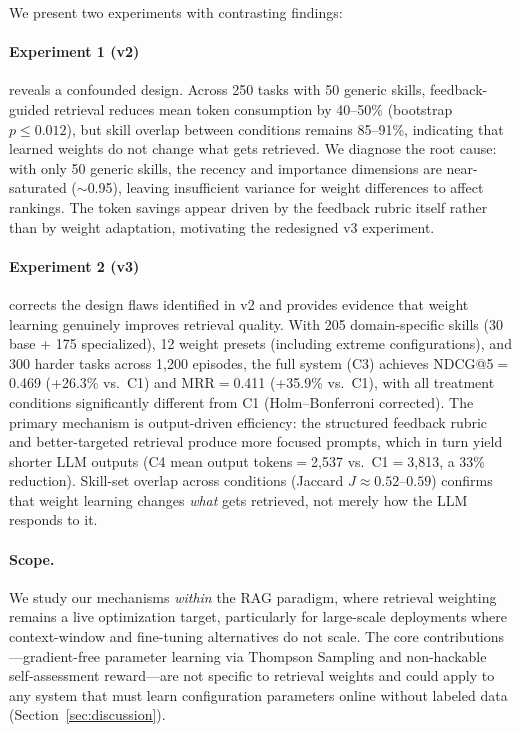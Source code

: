We present two experiments with contrasting findings:

\paragraph{Experiment 1 (v2)} reveals a confounded design.
Across 250 tasks with 50 generic skills, feedback-guided retrieval reduces mean token consumption by 40--50\% (bootstrap $p \leq 0.012$), but skill overlap between conditions remains 85--91\%, indicating that learned weights do not change what gets retrieved.
We diagnose the root cause: with only 50 generic skills, the recency and importance dimensions are near-saturated (${\sim}$0.95), leaving insufficient variance for weight differences to affect rankings.
The token savings appear driven by the feedback rubric itself rather than by weight adaptation, motivating the redesigned v3 experiment.

\paragraph{Experiment 2 (v3)} corrects the design flaws identified in v2 and provides evidence that weight learning genuinely improves retrieval quality.
With 205 domain-specific skills (30 base + 175 specialized), 12 weight presets (including extreme configurations), and 300 harder tasks across 1,200 episodes, the full system (C3) achieves NDCG@5${=}$0.469 (+26.3\% vs.\ C1) and MRR${=}$0.411 (+35.9\% vs.\ C1), with all treatment conditions significantly different from C1 (Holm--Bonferroni corrected).
The primary mechanism is output-driven efficiency: the structured feedback rubric and better-targeted retrieval produce more focused prompts, which in turn yield shorter LLM outputs (C4 mean output tokens${=}$2{,}537 vs.\ C1${=}$3{,}813, a 33\% reduction).
Skill-set overlap across conditions (Jaccard $J{\approx}0.52$--$0.59$) confirms that weight learning changes \emph{what} gets retrieved, not merely how the LLM responds to it.

\paragraph{Scope.}
We study our mechanisms \emph{within} the RAG paradigm, where retrieval weighting remains a live optimization target, particularly for large-scale deployments where context-window and fine-tuning alternatives do not scale.
The core contributions---gradient-free parameter learning via Thompson Sampling and non-hackable self-assessment reward---are not specific to retrieval weights and could apply to any system that must learn configuration parameters online without labeled data (Section~\ref{sec:discussion}).

